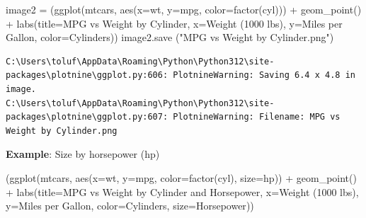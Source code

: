 \documentclass[
  letterpaper,
  DIV=11,
  numbers=noendperiod]{scrreprt}
\newenvironment{Shaded}{\begin{snugshade}}{\end{snugshade}}
\newcommand{\NormalTok}[1]{\textcolor[rgb]{0.00,0.23,0.31}{#1}}
\newcommand{\OperatorTok}[1]{\textcolor[rgb]{0.37,0.37,0.37}{#1}}
\newcommand{\StringTok}[1]{\textcolor[rgb]{0.13,0.47,0.30}{#1}}
\begin{document}
\begin{Shaded}
\begin{Highlighting}[]
\NormalTok{image2 }\OperatorTok{=}\NormalTok{ (ggplot(mtcars, aes(x}\OperatorTok{=}\StringTok{\textquotesingle{}wt\textquotesingle{}}\NormalTok{, y}\OperatorTok{=}\StringTok{\textquotesingle{}mpg\textquotesingle{}}\NormalTok{, color}\OperatorTok{=}\StringTok{\textquotesingle{}factor(cyl)\textquotesingle{}}\NormalTok{)) }\OperatorTok{+}
\NormalTok{ geom\_point() }\OperatorTok{+}
\NormalTok{ labs(title}\OperatorTok{=}\StringTok{\textquotesingle{}MPG vs Weight by Cylinder\textquotesingle{}}\NormalTok{,}
\NormalTok{      x}\OperatorTok{=}\StringTok{\textquotesingle{}Weight (1000 lbs)\textquotesingle{}}\NormalTok{,}
\NormalTok{      y}\OperatorTok{=}\StringTok{\textquotesingle{}Miles per Gallon\textquotesingle{}}\NormalTok{,}
\NormalTok{      color}\OperatorTok{=}\StringTok{\textquotesingle{}Cylinders\textquotesingle{}}\NormalTok{))}
\NormalTok{image2.save (}\StringTok{"MPG vs Weight by Cylinder.png"}\NormalTok{)}
\end{Highlighting}
\end{Shaded}

\begin{verbatim}
C:\Users\toluf\AppData\Roaming\Python\Python312\site-packages\plotnine\ggplot.py:606: PlotnineWarning: Saving 6.4 x 4.8 in image.
C:\Users\toluf\AppData\Roaming\Python\Python312\site-packages\plotnine\ggplot.py:607: PlotnineWarning: Filename: MPG vs Weight by Cylinder.png
\end{verbatim}

\textbf{Example}: Size by horsepower (hp)

\begin{Shaded}
\begin{Highlighting}[]
\NormalTok{(ggplot(mtcars, aes(x}\OperatorTok{=}\StringTok{\textquotesingle{}wt\textquotesingle{}}\NormalTok{, y}\OperatorTok{=}\StringTok{\textquotesingle{}mpg\textquotesingle{}}\NormalTok{, color}\OperatorTok{=}\StringTok{\textquotesingle{}factor(cyl)\textquotesingle{}}\NormalTok{, size}\OperatorTok{=}\StringTok{\textquotesingle{}hp\textquotesingle{}}\NormalTok{)) }\OperatorTok{+}
\NormalTok{ geom\_point() }\OperatorTok{+}
\NormalTok{ labs(title}\OperatorTok{=}\StringTok{\textquotesingle{}MPG vs Weight by Cylinder and Horsepower\textquotesingle{}}\NormalTok{,}
\NormalTok{      x}\OperatorTok{=}\StringTok{\textquotesingle{}Weight (1000 lbs)\textquotesingle{}}\NormalTok{,}
\NormalTok{      y}\OperatorTok{=}\StringTok{\textquotesingle{}Miles per Gallon\textquotesingle{}}\NormalTok{,}
\NormalTok{      color}\OperatorTok{=}\StringTok{\textquotesingle{}Cylinders\textquotesingle{}}\NormalTok{,}
\NormalTok{      size}\OperatorTok{=}\StringTok{\textquotesingle{}Horsepower\textquotesingle{}}\NormalTok{))}
\end{Highlighting}
\end{Shaded}
\end{document}
